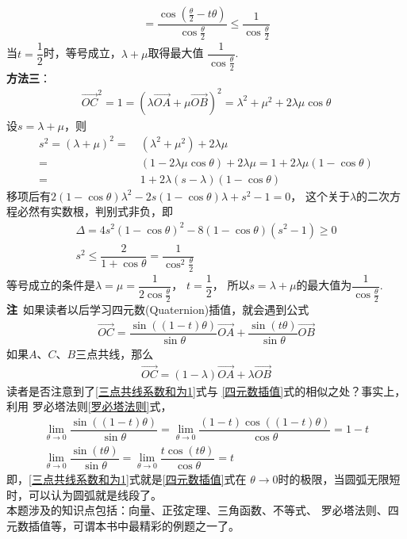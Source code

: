 \begin{enumerate}[label={【\textbf{例\thechapter.\arabic*}】},
 leftmargin=\inteval{\myenumleftmargin}pt,
 itemsep=\inteval{\myenumitempsep}pt,
 itemindent=\inteval{\myenumitemindent}pt]
\begin{align*}
    =\dfrac{\cos(\frac{\theta}{2}-t\theta)}{\cos\frac{\theta}{2}}
    \leq\dfrac{1}{\cos\frac{\theta}{2}}
\end{align*}
当$t=\dfrac{1}{2}$时，等号成立，$\lambda+\mu$取得最大值
$ \dfrac{1}{\cos\frac{\theta}{2}} $. \\
\textbf{方法三}：\begin{gather*}
    \vec{OC}^2=1=\left(\lambda\vec{OA}+\mu\vec{OB}\right)^2
    =\lambda^2+\mu^2+2\lambda\mu\cos\theta 
\end{gather*}
设$s=\lambda+\mu $，则
\begin{align*}
    s^2=(\lambda+\mu)^2=&\ (\lambda^2+\mu^2)+2\lambda\mu \\
    =&\ (1-2\lambda\mu\cos\theta)+2\lambda\mu=
    1+2\lambda\mu(1-\cos\theta) \\
    =&\ 1+2\lambda(s-\lambda)(1-\cos\theta) 
\end{align*}
移项后有$2(1-\cos\theta)\lambda^2-2s(1-\cos\theta)\lambda+s^2-1=0$，
这个关于$\lambda$的二次方程必然有实数根，判别式非负，即
\begin{gather*}
    \Delta=4s^2(1-\cos\theta)^2-8(1-\cos\theta) (s^2-1)\geq 0  \\
    s^2\leq \dfrac{2}{1+\cos\theta} 
    =\dfrac{1}{\cos^2\frac{\theta}{2}}
\end{gather*}
等号成立的条件是$\lambda=\mu=\dfrac{1}{2\cos\frac{\theta}{2}}$，
$t=\dfrac{1}{2}$，
所以$s=\lambda+\mu $的最大值为$ \dfrac{1}{\cos\frac{\theta}{2}} $. \\
\textbf{注}\ 如果读者以后学习四元数(Quaternion)插值，就会遇到公式
\begin{gather}\label{四元数插值}
    \vec{OC}=\dfrac{\sin((1-t)\theta)}{\sin\theta}
    \vec{OA}+\dfrac{\sin(t\theta)}{\sin\theta}\vec{OB} 
\end{gather}
如果$ A $、$ C $、$ B $三点共线，那么
\begin{gather}\label{三点共线系数和为1}
    \vec{OC}=(1-\lambda)\vec{OA}+\lambda\vec{OB}
\end{gather}
读者是否注意到了\eqref{三点共线系数和为1}式与
\eqref{四元数插值}式的相似之处？事实上，利用
罗必塔法则\eqref{罗必塔法则}式，
\begin{gather*}
    \lim_{\theta\to 0}\dfrac{\sin((1-t)\theta)}{\sin\theta}=
    \lim_{\theta\to 0}\dfrac{(1-t)\cos((1-t)\theta)}{\cos\theta}
    =1-t \\
    \lim_{\theta\to 0}\dfrac{\sin(t\theta)}{\sin\theta}=
    \lim_{\theta\to 0}\dfrac{t\cos(t\theta)}{\cos\theta}
    =t
\end{gather*}
即，\eqref{三点共线系数和为1}式就是\eqref{四元数插值}式在
$ \theta\to 0 $时的极限，当圆弧无限短时，可以认为圆弧就是线段了。\\
本题涉及的知识点包括：向量、正弦定理、三角函数、不等式、
罗必塔法则、四元数插值等，可谓本书中最精彩的例题之一了。


\end{enumerate}
